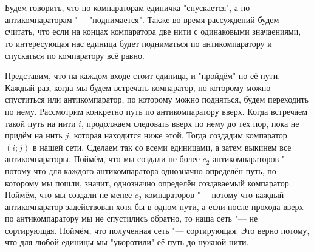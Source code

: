 \section{}
	Будем говорить, что по компараторам единичка "спускается", а по антикомпараторам "--- "поднимается". Также во время рассуждений будем считать, что если на концах компаратора две нити с одинаковыми значаениями, то интересующая нас единица будет подниматься по антикомпаратору и спускаться по компаратору всё равно.
	
	Представим, что на каждом входе стоит единица, и "пройдём" по её пути. Каждый раз, когда мы будем встречать компаратор, по которому можно спуститься или антикомпаратор, по которому можно подняться, будем переходить по нему. Рассмотрим конкретно путь по антикомпаратору вверх. Когда встречаем такой путь на нити $i$, продолжаем следовать вверх по нему до тех пор, пока не придём на нить $j$, которая находится ниже этой. Тогда создадим компаратор $(i; j)$ в нашей сети. Сделаем так со всеми единицами, а затем выкинем все антикомпараторы. Поймём, что мы создали не более $c_2$ антикомпараторов "--- потому что для каждого антикомпаратора однозначно определён путь, по которому мы пошли, значит, однозначно определён создаваемый компаратор. Поймём, что мы создали не менее $c_2$ компараторов "--- потому что каждый антикомпаратор задействован хотя бы в одном пути, а если после прохода вверх по антикомпаратору мы не спустились обратно, то наша сеть "--- не сортирующая. Поймём, что полученная сеть "--- сортирующая. Это верно потому, что для любой единицы мы "укоротили" её путь до нужной нити.